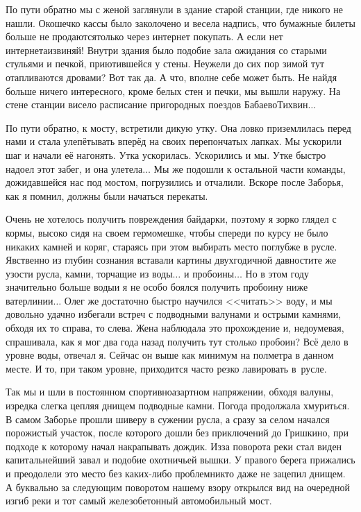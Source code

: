 По пути обратно мы с женой заглянули в здание старой станции, где никого не нашли. Окошечко кассы было заколочено и весела надпись, что бумажные билеты больше не продаются\mdash только через интернет покупать. А если нет интернета\mdash извиняй! Внутри здания было подобие зала ожидания со старыми стульями и печкой, приютившейся у стены. Неужели до сих пор зимой тут отапливаются дровами? Вот так да. А что, вполне себе может быть. Не найдя больше ничего интересного, кроме белых стен и печки, мы вышли наружу. На стене станции висело расписание пригородных поездов Бабаево\sdash Тихвин$\ldots$ 

По пути обратно, к мосту, встретили дикую утку. Она ловко приземлилась перед нами и стала улепётывать вперёд на своих перепончатых лапках. Мы ускорили шаг и начали её нагонять. Утка ускорилась. Ускорились и мы. Утке быстро надоел этот забег, и она улетела$\ldots$ Мы же подошли к остальной части команды, дожидавшейся нас под мостом, погрузились и отчалили. Вскоре после Заборья, как я помнил, должны были начаться перекаты.

Очень не хотелось получить повреждения байдарки, поэтому я зорко глядел с кормы, высоко сидя на своем гермомешке, чтобы спереди по курсу не было никаких камней и коряг, стараясь при этом выбирать место поглубже в русле. Явственно из глубин сознания вставали картины двухгодичной давности\mdash те же узости русла, камни, торчащие из воды$\ldots$ и пробоины$\ldots$ Но в этом году значительно больше воды\mdash и я не особо боялся получить пробоину ниже ватерлинии$\ldots$ Олег же достаточно быстро научился <<читать>> воду, и мы довольно удачно избегали встреч с подводными валунами и острыми камнями, обходя их то справа, то слева. Жена наблюдала это прохождение и, недоумевая, спрашивала, как я мог два года назад получить тут столько пробоин? Всё дело в уровне воды, отвечал я. Сейчас он выше как минимум на полметра в данном месте. И то, при таком уровне, приходится часто резко лавировать в~русле. 

Так мы и шли в постоянном спортивно\sdash азартном напряжении, обходя валуны, изредка слегка цепляя днищем подводные камни. Погода продолжала хмуриться. В самом Заборье прошли шиверу в сужении русла, а сразу за селом начался порожистый участок, после которого дошли без приключений до Гришкино, при подходе к которому начал накрапывать дождик. Из\sdash за поворота реки стал виден капитальнейший завал и подобие охотничьей вышки. У правого берега прижались и преодолели это место без каких-либо проблем\mdash никто даже не зацепил днищем. А буквально за следующим поворотом нашему взору открылся вид на очередной изгиб реки и тот самый железобетонный автомобильный мост. 

